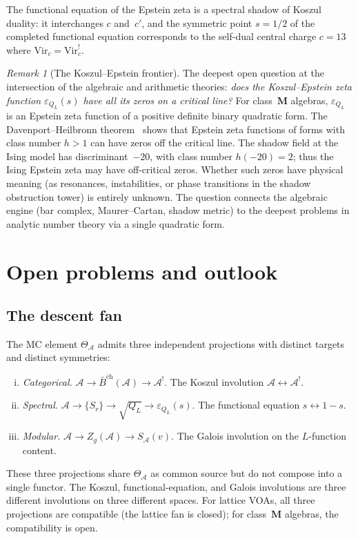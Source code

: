 \documentclass[11pt,reqno]{amsart}
\theoremstyle{definition}
\theoremstyle{remark}
\newtheorem{remark}[theorem]{Remark}
\newcommand{\cA}{\mathcal{A}}
\newcommand{\barB}{\bar{B}}
\newcommand{\Vir}{\mathrm{Vir}}
\numberwithin{equation}{section}
\begin{document}
The functional equation of the Epstein zeta is a spectral
shadow of Koszul duality: it interchanges $c$ and~$c'$,
and the symmetric point $s = 1/2$ of the completed functional
equation corresponds to the self-dual central charge $c = 13$
where $\Vir_c = \Vir_c^!$.

\begin{remark}[The Koszul--Epstein frontier]
\label{rem:koszul-epstein-frontier}
The deepest open question at the intersection of the algebraic
and arithmetic theories: \emph{does the Koszul--Epstein zeta
function $\varepsilon_{Q_L}(s)$ have all its zeros on a
critical line?} For class~$\mathbf{M}$ algebras,
$\varepsilon_{Q_L}$ is an Epstein zeta function of a
positive definite binary quadratic form. The Davenport--Heilbronn
theorem~\cite{DavenportHeilbronn36} shows that Epstein zeta
functions of forms with class number $h > 1$ can have zeros
off the critical line. The shadow field at the Ising model
has discriminant~$-20$, with class number $h(-20) = 2$; thus
the Ising Epstein zeta may have off-critical zeros. Whether
such zeros have physical meaning (as resonances, instabilities,
or phase transitions in the shadow obstruction tower) is entirely unknown.
The question connects the algebraic engine (bar complex,
Maurer--Cartan, shadow metric) to the deepest problems in
analytic number theory via a single quadratic form.
\end{remark}



\section{Open problems and outlook}\label{sec:outlook}

\subsection{The descent fan}

The MC element $\Theta_\cA$ admits three independent
projections with distinct targets and distinct symmetries:
\begin{enumerate}[(i)]
\item \emph{Categorical.}
 $\cA \to \barB^{\mathrm{ch}}(\cA) \to \cA^!$.
 The Koszul involution $\cA \leftrightarrow \cA^!$.
\item \emph{Spectral.}
 $\cA \to \{S_r\} \to \sqrt{Q_L} \to \varepsilon_{Q_L}(s)$.
 The functional equation $s \leftrightarrow 1 - s$.
\item \emph{Modular.}
 $\cA \to Z_g(\cA) \to S_\cA(v)$.
 The Galois involution on the $L$-function content.
\end{enumerate}
These three projections share $\Theta_\cA$ as common source
but do not compose into a single functor. The Koszul,
functional-equation, and Galois involutions are three different
involutions on three different spaces. For lattice VOAs, all
three projections are compatible (the lattice fan is closed);
for class~$\mathbf{M}$ algebras, the compatibility is open.
\end{document}
